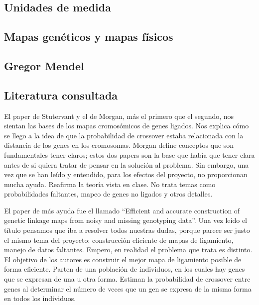 \documentclass{article}
\begin{document}
	\subsection{Unidades de medida}
	
	
	
	\subsection{Mapas genéticos y mapas físicos}
	
	
	
	\subsection{Gregor Mendel}
	
	
	
	\subsection{Literatura consultada}
	El paper de Stutervant y el de Morgan, más el primero que el segundo, nos sientan las bases de los mapas cromosómicos de genes ligados. Nos explica cómo se llego a la idea de que la probabilidad de crossover estaba relacionada con la distancia de los genes en los cromosomas.  Morgan define conceptos que son fundamentales tener claros; estos dos papers son la base que había que tener clara antes de si quiera tratar de pensar en la solución al problema. Sin embargo, una vez que se han leído y entendido, para los efectos del proyecto, no proporcionan mucha ayuda. Reafirma la teoría vista en clase. No trata temas como probabilidades faltantes, mapeo de genes no ligados y otros detalles.

	El paper de más ayuda fue el llamado “Efficient and accurate construction of genetic linkage maps from noisy and missing genotyping data”. Una vez leído el título pensamos que iba a resolver todos nuestras dudas, porque parece ser justo el mismo tema del proyecto: construcción eficiente de mapas de ligamiento, manejo de datos faltantes. Empero, en realidad el problema que trata es distinto. El objetivo de los autores es construir el mejor mapa de ligamiento posible de forma eficiente. Parten de una población de individuos, en los cuales hay genes que se expresan de una u otra forma. Estiman la probabilidad de crossover entre genes al determinar el número de veces que un gen se expresa de la misma forma en todos los individuos.
\end{document}
